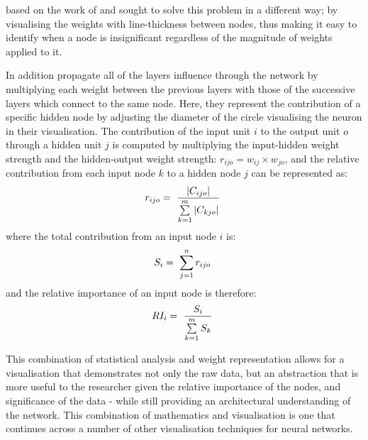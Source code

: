 \documentclass[a4paper,11pt,titlepage]{article}
\begin{document}
	\cite{Tzeng2005} based on the work of 	\cite{Garson1991} and \cite{Goh1995} sought to solve this problem in a different way; by visualising the weights with line-thickness between nodes, thus making it easy to identify when a node is insignificant regardless of the magnitude of weights applied to it.
	\par 
	In addition 	\cite{Tzeng2005} propagate all of the layers influence through the network by multiplying each weight between the previous layers with those of the successive layers which connect to the same node. Here, they represent the contribution of a specific hidden node by adjusting the diameter of the circle visualising the neuron in their visualisation. The contribution of the input unit $ i $ to the output unit $ o $ through a hidden unit $ j $ is computed by multiplying the input-hidden weight strength and the hidden-output weight strength:
$ r_{ijo} = w_{ij} \times w_{jo} $, and the relative contribution from each input node $ k $ to a hidden node $ j $ can be represented as:
		$$
		r_{ijo} = 
		\text{ $ \frac{|C_{ijo}|}{\sum\limits_{k=1}^m |C_{kjo}| } $ }
		$$ 
	where the total contribution from an input node $ i $ is: 
		$$
		S_{i} = 
		\text{ $ \sum\limits_{j=1}^n r_{ijo} $ }
		$$ 
	and the relative importance of an input node is therefore:
		$$
		RI_{i} = 
		\text{ $ \frac{S_{i}}{\sum\limits_{k=1}^m S_{k} } $ }
		$$ 
	 \par 
 		
	 This combination of statistical analysis and weight representation allows for a visualisation that demonstrates not only the raw data, but an abstraction that is more useful to the researcher given the relative importance of the nodes, and significance of the data - while still providing an architectural understanding of the network. This combination of mathematics and visualisation is one that continues across a number of other visualisation techniques for neural networks.
	 
\end{document}
